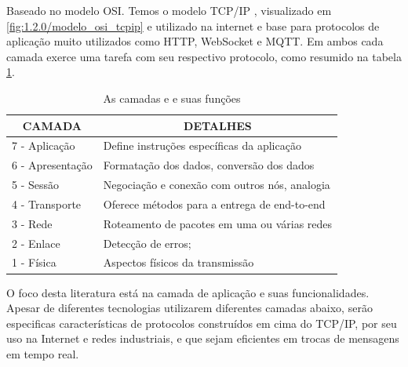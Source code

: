 Baseado no modelo OSI. Temos o modelo TCP/IP \cite{TCPIP}, visualizado em \ref{fig:1.2.0/modelo_osi_tcpip} e utilizado na internet e base para protocolos de aplicação muito utilizados como HTTP, WebSocket e MQTT. Em ambos cada camada exerce uma tarefa com seu respectivo protocolo, como resumido na tabela \ref{table:1.2.0}.

\begin{table}[h]
\centering
\caption{As camadas e e suas funções}
\begin{tabular}{|l|l|}
\hline
\multicolumn{1}{|c|}{CAMADA} & \multicolumn{1}{c|}{DETALHES}                                                  \\ \hline
7 - Aplicação                & Define instruções específicas da aplicação          						    \\ \hline
6 - Apresentação             & Formatação dos dados, conversão dos dados                     					\\ \hline
5 - Sessão                   & Negociação e conexão com outros nós, analogia                                \\ \hline
4 - Transporte               & Oferece métodos para a entrega de end-to-end                        			\\ \hline
3 - Rede                     & Roteamento de pacotes em uma ou várias redes                                 \\ \hline
2 - Enlace                   & Detecção de erros;                                                            \\ \hline
1 - Física                   & Aspectos físicos da transmissão \\ \hline
\end{tabular}
\label{table:1.2.0}
\end{table}


O foco desta literatura está na camada de aplicação e suas funcionalidades. Apesar de diferentes tecnologias utilizarem diferentes camadas abaixo, serão especificas características de protocolos construídos em cima do TCP/IP, por seu uso na Internet e redes industriais, e que sejam eficientes em trocas de mensagens em tempo real.

